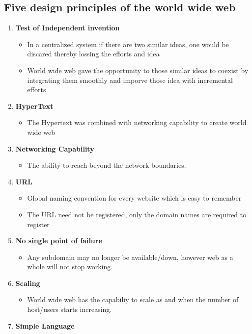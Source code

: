 \documentclass{resources/WeSTassignment}
\begin{document}
\subsection{Five design principles of the world wide web}
\begin{enumerate}
    \item \textbf{Test of Independent invention}
	\begin{itemize}
    		\item In a centralized system if there are two similar ideas, one would be discared thereby lossing the efforts and idea
		\item World wide web gave the opportunity to those similar ideas to coexist by integrating them smoothly and imporve those idea with incremental efforts
	\end{itemize}
    \item \textbf{HyperText}
	\begin{itemize}
    		\item The Hypertext was combined with networking capability to create world wide web
	\end{itemize}
    \item \textbf{Networking Capability}
	\begin{itemize}
    		\item The ability to reach beyond the network boundaries.
	\end{itemize}
    \item \textbf{URL}
	\begin{itemize}
    		\item Global naming convention for every website which is easy to remember
		\item The URL need not be registered, only the domain names are required to register
	\end{itemize}
    \item \textbf{No single point of failure}
	\begin{itemize}
    		\item Any subdomain may no longer be available/down, however web as a whole will not stop working.
	\end{itemize}
    \item \textbf{Scaling}
	\begin{itemize}
    		\item World wide web has the capabiliy to scale as and when the number of host/users starts increasing.
	\end{itemize}
    \item \textbf{Simple Language}

\end{enumerate}
\end{document}
